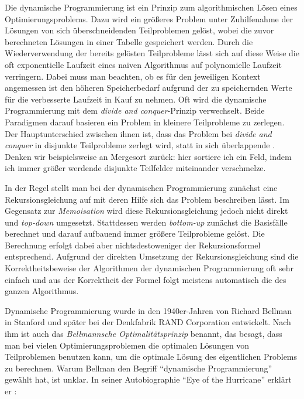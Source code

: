 Die dynamische Programmierung ist ein Prinzip zum algorithmischen Lösen eines Optimierungsproblems. Dazu wird ein größeres Problem unter Zuhilfenahme der Lösungen von sich überschneidenden Teilproblemen gelöst, wobei die zuvor berechneten Lösungen in einer Tabelle gespeichert werden. Durch die Wiederverwendung der bereits gelösten Teilprobleme lässt sich auf diese Weise die oft exponentielle Laufzeit eines naiven Algorithmus auf polynomielle Laufzeit verringern. Dabei muss man beachten, ob es für den jeweiligen Kontext angemessen ist den höheren Speicherbedarf aufgrund der zu speichernden Werte für die verbesserte Laufzeit in Kauf zu nehmen. Oft wird die dynamische Programmierung mit dem \emph{divide and conquer}-Prinzip verwechselt. Beide Paradigmen darauf basieren ein Problem in kleinere Teilprobleme zu zerlegen. Der Hauptunterschied zwischen ihnen ist, dass das Problem bei \emph{divide and conquer} in disjunkte Teilprobleme zerlegt wird, statt in sich überlappende \citep{clrs09}. Denken wir beispielsweise an Mergesort zurück: hier sortiere ich ein Feld, indem ich immer größer werdende disjunkte Teilfelder miteinander verschmelze.

In der Regel stellt man bei der dynamischen Programmierung zunächst eine Rekursionsgleichung auf mit deren Hilfe sich das Problem beschreiben lässt. Im Gegensatz zur \emph{Memoisation} wird diese Rekursionsgleichung jedoch nicht direkt und \emph{top-down} umgesetzt. Stattdessen werden \emph{bottom-up} zunächst die Basisfälle berechnet und darauf aufbauend immer größere Teilprobleme gelöst. Die Berechnung erfolgt dabei aber nichtsdestoweniger der Rekursionsformel entsprechend. Aufgrund der direkten Umsetzung der Rekursionsgleichung sind die Korrektheitsbeweise der Algorithmen der dynamischen Programmierung oft sehr einfach und aus der Korrektheit der Formel folgt meistens automatisch die des ganzen Algorithmus.

Dynamische Programmierung wurde in den 1940er-Jahren von Richard Bellman in Stanford und später bei der Denkfabrik RAND Corporation entwickelt. Nach ihm ist auch das \emph{Bellmannsche Optimalitätsprinzip} benannt, das besagt, dass man bei vielen Optimierungsproblemen die optimalen Lösungen von Teilproblemen benutzen kann, um die optimale Lösung des eigentlichen Problems zu berechnen. Warum Bellman den Begriff \enquote{dynamische Programmierung} gewählt hat, ist unklar. In seiner Autobiographie \enquote{Eye of the Hurricane} erklärt er \citep{b84}:

